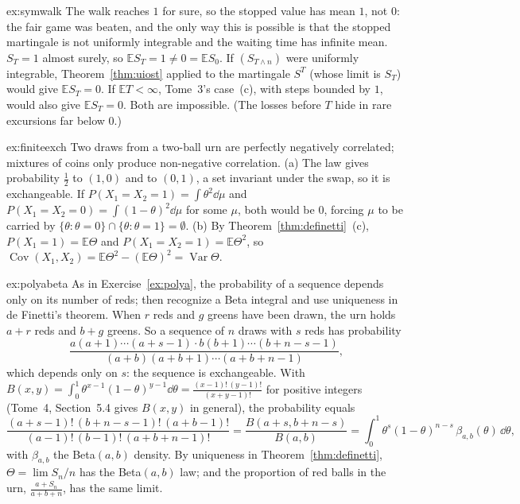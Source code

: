 \begin{solution}{ex:symwalk}
\idea The walk reaches $1$ for sure, so the stopped value has mean $1$, not $0$: the fair game was beaten, and the only way this is possible is that the stopped martingale is not uniformly integrable and the waiting time has infinite mean.
\writeup $S_T=1$ almost surely, so $\mathbb ES_T=1\neq0=\mathbb ES_0$. If $(S_{T\wedge n})$ were uniformly integrable, Theorem~\ref{thm:uiost} applied to the martingale $S^T$ (whose limit is $S_T$) would give
$\mathbb ES_T=0$. If $\mathbb ET<\infty$, Tome~3's case~(c), with steps bounded by $1$, would also give $\mathbb ES_T=0$. Both are impossible. (The losses before $T$ hide in rare excursions far below $0$.)
\end{solution}

\begin{solution}{ex:finiteexch}
\idea Two draws from a two-ball urn are perfectly negatively correlated; mixtures of coins only produce non-negative correlation.
\writeup (a) The law gives probability $\frac12$ to $(1,0)$ and to $(0,1)$, a set invariant under the swap, so it is exchangeable. If $P(X_1=X_2=1)=\int\theta^2\dd\mu$ and $P(X_1=X_2=0)=\int(1-\theta)^2\dd\mu$ for some $\mu$,
both would be $0$, forcing $\mu$ to be carried by $\{\theta:\theta=0\}\cap\{\theta:\theta=1\}=\emptyset$. (b) By Theorem~\ref{thm:definetti}~(c), $P(X_1=1)=\mathbb E\Theta$ and $P(X_1=X_2=1)=\mathbb E\Theta^2$, so
$\operatorname{Cov}(X_1,X_2)=\mathbb E\Theta^2-(\mathbb E\Theta)^2=\operatorname{Var}\Theta$.
\end{solution}

\begin{solution}{ex:polyabeta}
\idea As in Exercise~\ref{ex:polya}, the probability of a sequence depends only on its number of reds; then recognize a Beta integral and use uniqueness in de Finetti's theorem.
\writeup When $r$ reds and $g$ greens have been drawn, the urn holds $a+r$ reds and $b+g$ greens. So a sequence of $n$ draws with $s$ reds has probability
\[
\frac{a(a+1)\cdots(a+s-1)\cdot b(b+1)\cdots(b+n-s-1)}{(a+b)(a+b+1)\cdots(a+b+n-1)},
\]
which depends only on $s$: the sequence is exchangeable. With $B(x,y)=\int_0^1\theta^{x-1}(1-\theta)^{y-1}\dd\theta=\frac{(x-1)!\,(y-1)!}{(x+y-1)!}$ for positive integers (Tome~4, Section~5.4 gives $B(x,y)$ in general), the probability equals
\[
\frac{(a+s-1)!\,(b+n-s-1)!\,(a+b-1)!}{(a-1)!\,(b-1)!\,(a+b+n-1)!}=\frac{B(a+s,b+n-s)}{B(a,b)}=\int_0^1\theta^s(1-\theta)^{n-s}\,\beta_{a,b}(\theta)\,\dd\theta,
\]
with $\beta_{a,b}$ the Beta$(a,b)$ density. By uniqueness in Theorem~\ref{thm:definetti}, $\Theta=\lim S_n/n$ has the Beta$(a,b)$ law; and the proportion of red balls in the urn, $\frac{a+S_n}{a+b+n}$, has the same limit.
\end{solution}

